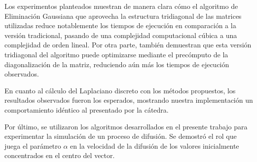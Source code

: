 Los experimentos planteados muestran de manera clara cómo el algoritmo de Eliminación Gaussiana que aprovecha la estructura tridiagonal de las matrices utilizadas reduce notablemente los tiempos de ejecución en comparación a la versión tradicional, pasando de una complejidad computacional cúbica a una complejidad de orden lineal. Por otra parte, también demuestran que esta versión tridiagonal del algoritmo puede optimizarse mediante el precómputo de la diagonalización de la matriz, reduciendo aún más los tiempos de ejecución observados.

En cuanto al cálculo del Laplaciano discreto con los métodos propuestos, los resultados observados fueron los esperados, mostrando nuestra implementación un comportamiento idéntico al presentado por la cátedra.

Por último, se utilizaron los algoritmos desarrollados en el presente trabajo para experimentar la simulación de un proceso de difusión. Se demostró el rol que juega el parámetro $\alpha$ en la velocidad de la difusión de los valores inicialmente concentrados en el centro del vector.